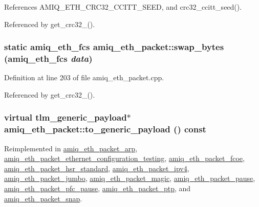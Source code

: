 References AMIQ\_\-ETH\_\-CRC32\_\-CCITT\_\-SEED, and crc32\_\-ccitt\_\-seed().

Referenced by get\_\-crc32\_().\hypertarget{classamiq__eth__packet_a1d83e7013b03e4cb3cccca9d4cae3a4e}{
\subsubsection[{swap\_\-bytes}]{\setlength{\rightskip}{0pt plus 5cm}static {\bf amiq\_\-eth\_\-fcs} amiq\_\-eth\_\-packet::swap\_\-bytes ({\bf amiq\_\-eth\_\-fcs} {\em data})}}
\label{classamiq__eth__packet_a1d83e7013b03e4cb3cccca9d4cae3a4e}


Definition at line 203 of file amiq\_\-eth\_\-packet.cpp.

Referenced by get\_\-crc32\_().\hypertarget{classamiq__eth__packet_a6dd92751d8172eeaa347d71bb415b0d5}{
\subsubsection[{to\_\-generic\_\-payload}]{\setlength{\rightskip}{0pt plus 5cm}virtual tlm\_\-generic\_\-payload$\ast$ amiq\_\-eth\_\-packet::to\_\-generic\_\-payload () const}}
\label{classamiq__eth__packet_a6dd92751d8172eeaa347d71bb415b0d5}


Reimplemented in \hyperlink{classamiq__eth__packet__arp_a24f433f25d4cec2799e58a836c1411f0}{amiq\_\-eth\_\-packet\_\-arp}, \hyperlink{classamiq__eth__packet__ethernet__configuration__testing_a0134f20913a67a5dafe334a450be8bb3}{amiq\_\-eth\_\-packet\_\-ethernet\_\-configuration\_\-testing}, \hyperlink{classamiq__eth__packet__fcoe_aa341b2f7df8abf278713e98015565c9f}{amiq\_\-eth\_\-packet\_\-fcoe}, \hyperlink{classamiq__eth__packet__hsr__standard_aa145fe8cc2731124d2c9e0bfb61bacf2}{amiq\_\-eth\_\-packet\_\-hsr\_\-standard}, \hyperlink{classamiq__eth__packet__ipv4_aefadeb6546366f09657c03790fe4ce90}{amiq\_\-eth\_\-packet\_\-ipv4}, \hyperlink{classamiq__eth__packet__jumbo_a3d838f8920b63ead671eaab21483d74f}{amiq\_\-eth\_\-packet\_\-jumbo}, \hyperlink{classamiq__eth__packet__magic_adfe68e5b2702826b23d606caf90ab2bc}{amiq\_\-eth\_\-packet\_\-magic}, \hyperlink{classamiq__eth__packet__pause_ab59bd7087700e15e79018f72d809d76a}{amiq\_\-eth\_\-packet\_\-pause}, \hyperlink{classamiq__eth__packet__pfc__pause_aaf46b734371ab160eba8764a4e398516}{amiq\_\-eth\_\-packet\_\-pfc\_\-pause}, \hyperlink{classamiq__eth__packet__ptp_a7c1a6b1207ce7e9e604e05cd883bccc0}{amiq\_\-eth\_\-packet\_\-ptp}, and \hyperlink{classamiq__eth__packet__snap_a99256008f171d933ec625d7957b64270}{amiq\_\-eth\_\-packet\_\-snap}.

